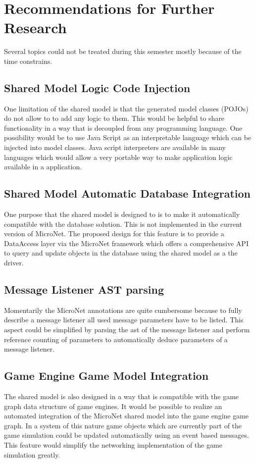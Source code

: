 \section{Recommendations for Further Research}

Several topics could not be treated during this semester mostly because of the
time constrains.

\subsection{Shared Model Logic Code Injection}
\label{sub:model_code_injection}

One limitation of the shared model is that the generated model classes (POJOs)
do not allow to to add any logic to them. This would be helpful to share
functionality in a way that is decoupled from any programming language. One
possibility would be to use Java Script as an interpretable language which can
be injected into model classes. Java script interpreters are available in many
languages which would allow a very portable way to make application logic
available in a \ms{} application.

\subsection{Shared Model Automatic Database Integration}

One purpose that the shared model is designed to is to make it automatically
compatible with the database solution. This is not implemented in the current
version of MicroNet. The proposed design for this feature is to provide a
DataAccess layer via the MicroNet framework which offers a comprehensive API to
query and update objects in the database using the shared model as a the driver.

\subsection{Message Listener AST parsing}

Momentarily the MicroNet annotations are quite cumbersome because to fully
describe a message listener all used message parameters have to be listed. This
aspect could be simplified by parsing the \gls{ast} of the message listener and
perform reference counting of parameters to automatically deduce parameters of a
message listener. 

\subsection{Game Engine Game Model Integration}

The shared model is also designed in a way that is compatible with the game
graph data structure of game engines. It would be possible to realize an
automated integration of the MicroNet shared model into the game engine game
graph. In a system of this nature game objects which are currently part of the
game simulation could be updated automatically using an event based messages.
This feature would simplify the networking implementation of the game simulation
greatly.
